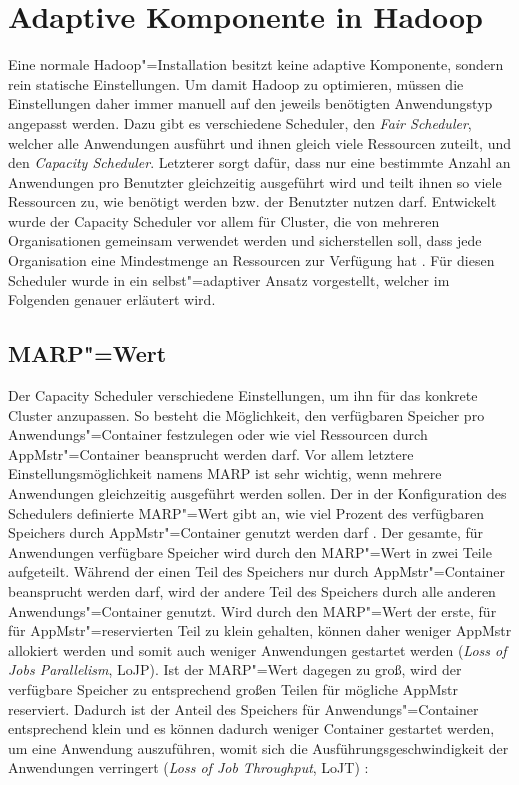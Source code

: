 \section{Adaptive Komponente in Hadoop}
\label{sec:inriaSetting}

Eine normale Hadoop"=Installation besitzt keine adaptive Komponente, sondern rein statische Einstellungen.
Um damit Hadoop zu optimieren, müssen die Einstellungen daher immer manuell auf den jeweils benötigten Anwendungstyp angepasst werden.
Dazu gibt es verschiedene Scheduler, den \emph{Fair Scheduler}, welcher alle Anwendungen ausführt und ihnen gleich viele Ressourcen zuteilt, und den \emph{Capacity Scheduler}.
Letzterer sorgt dafür, dass nur eine bestimmte Anzahl an Anwendungen pro Benutzter gleichzeitig ausgeführt wird und teilt ihnen so viele Ressourcen zu, wie benötigt werden bzw. der Benutzter nutzen darf.
Entwickelt wurde der Capacity Scheduler vor allem für Cluster, die von mehreren Organisationen gemeinsam verwendet werden und sicherstellen soll, dass jede Organisation eine Mindestmenge an Ressourcen zur Verfügung hat \cite{HadoopCapScheduler271}.
Für diesen Scheduler wurde in \cite{zhang2016} ein selbst"=adaptiver Ansatz vorgestellt, welcher im Folgenden genauer erläutert wird.

\subsection{\acs{MARP}"=Wert}
\label{sec:selfbalancingMarp}

Der Capacity Scheduler verschiedene Einstellungen, um ihn für das konkrete Cluster anzupassen.
So besteht \zB die Möglichkeit, den verfügbaren Speicher pro Anwendungs"=Container festzulegen oder wie viel Ressourcen durch \ac{AppMstr}"=Container beansprucht werden darf.
Vor allem letztere Einstellungsmöglichkeit namens \ac{MARP} ist sehr wichtig, wenn mehrere Anwendungen gleichzeitig ausgeführt werden sollen.
Der in der Konfiguration des Schedulers definierte \ac{MARP}"=Wert gibt an, wie viel Prozent des verfügbaren Speichers durch \ac{AppMstr}"=Container genutzt werden darf \cite{HadoopCapScheduler271}.
Der gesamte, für Anwendungen verfügbare Speicher wird durch den \ac{MARP}"=Wert in zwei Teile aufgeteilt.
Während der einen Teil des Speichers nur durch \ac{AppMstr}"=Container beansprucht werden darf, wird der andere Teil des Speichers durch alle anderen Anwendungs"=Container genutzt.
Wird durch den \ac{MARP}"=Wert der erste, für für \ac{AppMstr}"=reservierten Teil zu klein gehalten, können daher weniger \ac{AppMstr} allokiert werden und somit auch weniger Anwendungen gestartet werden (\emph{Loss of Jobs Parallelism}, LoJP).
Ist der \ac{MARP}"=Wert dagegen zu groß, wird der verfügbare Speicher zu entsprechend großen Teilen für mögliche \ac{AppMstr} reserviert.
Dadurch ist der Anteil des Speichers für Anwendungs"=Container entsprechend klein und es können dadurch weniger Container gestartet werden, um eine Anwendung auszuführen, womit sich die Ausführungsgeschwindigkeit der Anwendungen verringert (\emph{Loss of Job Throughput}, LoJT) \cite{zhang2016}:

